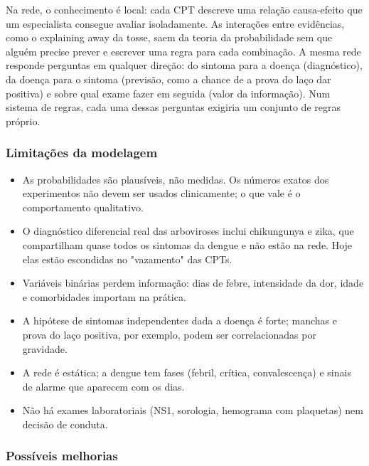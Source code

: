 \documentclass[12pt, a4paper]{article}
\providecommand{\tightlist}{%
  \setlength{\itemsep}{0pt}\setlength{\parskip}{0pt}}
\begin{document}
Na rede, o conhecimento é local: cada CPT descreve uma relação causa-efeito que um especialista consegue avaliar isoladamente. As interações entre evidências, como o explaining away da tosse, saem da teoria da probabilidade sem que alguém precise prever e escrever uma regra para cada combinação. A mesma rede responde perguntas em qualquer direção: do sintoma para a doença (diagnóstico), da doença para o sintoma (previsão, como a chance de a prova do laço dar positiva) e sobre qual exame fazer em seguida (valor da informação). Num sistema de regras, cada uma dessas perguntas exigiria um conjunto de regras próprio.

\subsubsection{Limitações da modelagem}\label{limitauxe7uxf5es-da-modelagem}

\begin{itemize}
\tightlist
\item
  As probabilidades são plausíveis, não medidas. Os números exatos dos experimentos não devem ser usados clinicamente; o que vale é o comportamento qualitativo.
\item
  O diagnóstico diferencial real das arboviroses inclui chikungunya e zika, que compartilham quase todos os sintomas da dengue e não estão na rede. Hoje elas estão escondidas no "vazamento" das CPTs.
\item
  Variáveis binárias perdem informação: dias de febre, intensidade da dor, idade e comorbidades importam na prática.
\item
  A hipótese de sintomas independentes dada a doença é forte; manchas e prova do laço positiva, por exemplo, podem ser correlacionadas por gravidade.
\item
  A rede é estática; a dengue tem fases (febril, crítica, convalescença) e sinais de alarme que aparecem com os dias.
\item
  Não há exames laboratoriais (NS1, sorologia, hemograma com plaquetas) nem decisão de conduta.
\end{itemize}

\subsubsection{Possíveis melhorias}\label{possuxedveis-melhorias}
\end{document}
